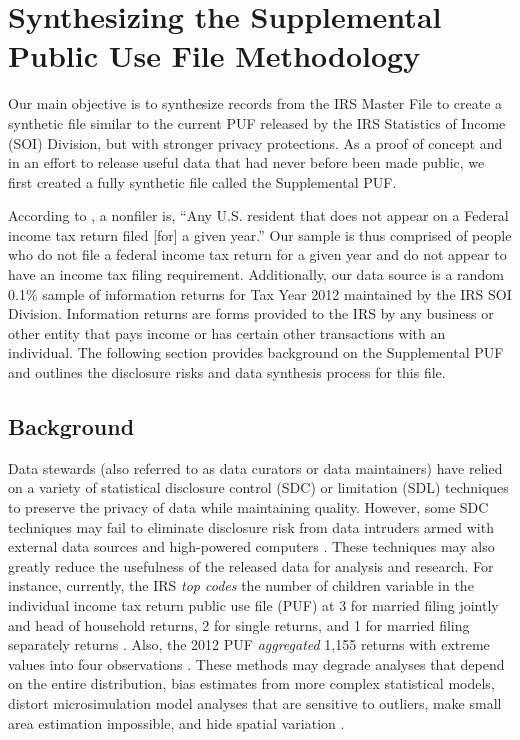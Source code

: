 \documentclass[11pt,runningheads,oribibl]{llncs}
\begin{document}
\section{Synthesizing the Supplemental Public Use File Methodology}\label{sec:method}

Our main objective is to synthesize records from the IRS Master File to create a synthetic file similar to the current PUF released by the IRS Statistics of Income (SOI) Division, but with stronger privacy protections. As a proof of concept and in an effort to release useful data that had never before been made public, we first created a fully synthetic file called the Supplemental PUF. 

According to \cite{cilke2014case}, a nonfiler is, ``Any U.S. resident that does not appear on a Federal income tax return filed [for] a given year.'' Our sample is thus comprised of people who do not file a federal income tax return for a given year and do not appear to have an income tax filing requirement. Additionally, our data source is a random 0.1\% sample of information returns for Tax Year 2012 maintained by the IRS SOI Division. Information returns are forms provided to the IRS by any business or other entity that pays income or has certain other transactions with an individual. The following section provides background on the Supplemental PUF and outlines the disclosure risks and data synthesis process for this file.

\subsection{Background}
Data stewards (also referred to as data curators or data maintainers) have relied on a variety of statistical disclosure control (SDC) or limitation (SDL) techniques to preserve the privacy of data while maintaining quality. However, some SDC techniques may fail to eliminate disclosure risk from data intruders armed with external data sources and high-powered computers \citep{drechsler2010sampling,winkler2007examples}. These techniques may also greatly reduce the usefulness of the released data for analysis and research. For instance, currently, the IRS \textit{top codes} the number of children variable in the individual income tax return public use file (PUF) at 3 for married filing jointly and head of household returns, 2 for single returns, and 1 for married filing separately returns \citep{bryant2017general}. Also, the 2012 PUF \textit{aggregated} 1,155 returns with extreme values into four observations \citep{bryant2017general}. These methods may degrade analyses that depend on the entire distribution, bias estimates from more complex statistical models, distort microsimulation model analyses that are sensitive to outliers, make small area estimation impossible, and hide spatial variation \citep{reiter2014bayesian,fuller1993masking}. 
\end{document}
